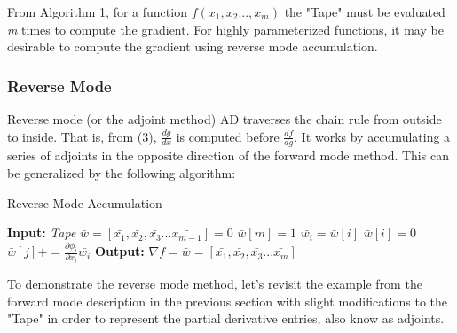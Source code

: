 \documentclass[oneside]{article}
\begin{document}
From Algorithm 1, for a function $f(x_1,x_2..., x_m)$ the "Tape" must be evaluated \textit{m} times to compute the gradient. For highly parameterized functions, it may be desirable to compute the gradient using reverse mode accumulation.


\subsubsection{Reverse Mode}
Reverse mode (or the adjoint method) AD traverses the chain rule from outside to inside. That is, from (3),  \textit{$\frac{dg}{dx}$} is computed before \textit{$\frac{df}{dg}$}. It works by accumulating a series of adjoints in the opposite direction of the forward mode method. This can be generalized by the following algorithm:
\begin{algorithm*}
  \caption{Reverse Mode Accumulation \cite{griewank2}}
  \begin{algorithmic}[1]
\State \textbf{Input:} \textit{Tape}
\State $\bar{w} = [\bar{ x_1},\bar{x_2},\bar{x_3}...\bar{x_{m-1}}] = 0$
\State $\bar{w}[m] = 1$
\State $\bar{w_i}=\bar{w}[i]$
\State $\bar{w}[i] = 0$
\State $\bar{w}[j] +=  \frac{\partial \phi_i}{\partial x_i}\bar{w_i}$
\EndFor
\EndFor
\State \textbf{Output:} $\nabla f = \bar{w} =  [\bar{ x_1},\bar{x_2},\bar{x_3}...\bar{x_{m}}]$
\end{algorithmic}
 \end{algorithm*}

To demonstrate the reverse mode method, let's revisit the example from the forward mode description in the previous section with slight modifications to the "Tape" in order to represent the partial derivative entries, also know as adjoints. \\
\end{document}
